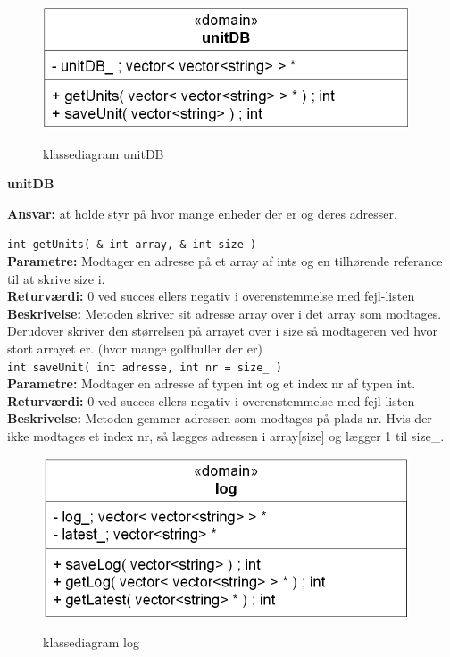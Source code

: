 \newpage

\begin{figure}[htbp] \centering
{\includegraphics[scale=1.5]{filer/design/Klassediagrammer/sw_unitDB}}
\caption{klassediagram unitDB}
\label{fig:unitDB klassediagram}
\end{figure} 

{\centering
\textbf{unitDB}\par
}
\textbf{Ansvar:} at holde styr på hvor mange enheder der er og deres adresser. \

\verb+int getUnits( & int array, & int size ) +\\
\textbf{Parametre:}  Modtager en adresse på et array af ints og en tilhørende referance til at skrive size i.\\
\textbf{Returværdi:} 0 ved succes ellers negativ i overenstemmelse med fejl-listen \\
\textbf{Beskrivelse:} Metoden skriver sit adresse array over i det array som modtages. Derudover skriver den størrelsen på arrayet over i size så modtageren ved hvor stort arrayet er. (hvor mange golfhuller der er)\\

\verb+int saveUnit( int adresse, int nr = size_ ) +\\
\textbf{Parametre:} Modtager en adresse af typen int og et index nr af typen int. \\
\textbf{Returværdi:} 0 ved succes ellers negativ i overenstemmelse med fejl-listen \\
\textbf{Beskrivelse:}  Metoden gemmer adressen som modtages på plads nr. Hvis der ikke modtages et index nr, så lægges adressen i array[size] og lægger 1 til size\_. \\


\newpage
\begin{figure}[htbp] \centering
{\includegraphics[scale=1.5]{filer/design/Klassediagrammer/sw_log}}
\caption{klassediagram log}
\label{fig:log klassediagram}
\end{figure} 

